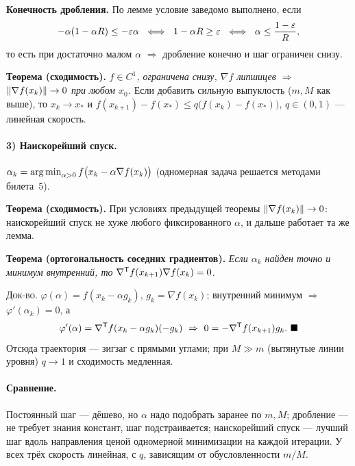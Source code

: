 \textbf{Конечность дробления.} По лемме условие заведомо выполнено, если
\[
  -\alpha(1-\alpha R) \le -\varepsilon\alpha
  \ \iff\ 1 - \alpha R \ge \varepsilon
  \ \iff\ \alpha \le \frac{1-\varepsilon}{R} ,
\]
то есть при достаточно малом $\alpha$ $\Rightarrow$ дробление конечно и шаг
ограничен снизу.

\textbf{Теорема (сходимость).} \textit{$f \in C^1$, ограничена снизу,
$\nabla f$ липшицев $\Rightarrow$ $\left\lVert \nabla f(x_k) \right\rVert \to 0$ при любом
$x_0$.} Если добавить сильную выпуклость ($m, M$ как выше), то
$x_k \to x_*$ и
$f(x_{k+1}) - f(x_*) \le q\big(f(x_k) - f(x_*)\big)$, $q \in (0,1)$ —
линейная скорость.

\paragraph{3) Наискорейший спуск.}
$\alpha_k = \operatorname*{arg\,min}_{\alpha > 0} f\big(x_k - \alpha\nabla f(x_k)\big)$
(одномерная задача решается методами билета~5).

\textbf{Теорема (сходимость).} При условиях предыдущей теоремы
$\left\lVert \nabla f(x_k) \right\rVert \to 0$: наискорейший спуск не хуже любого
фиксированного $\alpha$, и дальше работает та же лемма.

\textbf{Теорема (ортогональность соседних градиентов).}
\textit{Если $\alpha_k$ найден точно и минимум внутренний, то}
$\nabla^{\mathsf{T}} f(x_{k+1})\nabla f(x_k) = 0$.

\textsc{Док-во.} $\varphi(\alpha) = f(x_k - \alpha g_k)$, $g_k = \nabla f(x_k)$;
внутренний минимум $\Rightarrow$ $\varphi'(\alpha_k) = 0$, а
\[
  \varphi'(\alpha) = \nabla^{\mathsf{T}} f(x_k - \alpha g_k)(-g_k)
  \ \Rightarrow\
  0 = -\nabla^{\mathsf{T}} f(x_{k+1})g_k . \ \blacksquare
\]
Отсюда траектория — зигзаг с прямыми углами; при $M \gg m$ (вытянутые линии
уровня) $q \to 1$ и сходимость медленная.

\paragraph{Сравнение.}
Постоянный шаг — дёшево, но $\alpha$ надо подобрать заранее по $m, M$;
дробление — не требует знания констант, шаг подстраивается; наискорейший
спуск — лучший шаг вдоль направления ценой одномерной минимизации на каждой
итерации. У всех трёх скорость линейная, с $q$, зависящим от
обусловленности $m/M$.

